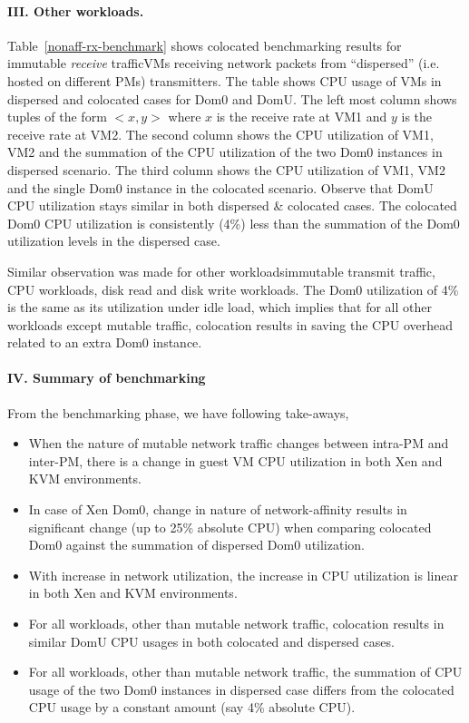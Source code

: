 \paragraph{III. Other workloads.}
Table~\ref{nonaff-rx-benchmark} shows colocated benchmarking
results for immutable \textit{receive} traffic\textemdash{}VMs receiving 
network packets from ``dispersed'' (i.e. hosted on different PMs) transmitters. 
The table shows CPU usage of VMs in
dispersed and colocated cases for Dom0 and DomU.
The left most column shows tuples of the form $<x,y>$ where
$x$ is the receive rate at VM1 and $y$ is the receive
rate at VM2. The second column shows the CPU utilization of 
VM1, VM2 and the summation of the CPU utilization of the two 
Dom0 instances in dispersed scenario. The third column shows
the CPU utilization of VM1, VM2 and the single Dom0 instance
in the colocated scenario.
Observe that
DomU CPU utilization stays similar in both dispersed \& colocated
cases.
The colocated Dom0
CPU utilization is consistently (4\%) less than 
the summation of the Dom0 utilization
levels in the dispersed case.

Similar observation was made for other workloads\textemdash{}immutable
transmit traffic, CPU workloads, disk read and disk write workloads. 
The Dom0 utilization of 4\% is the same as its utilization
under idle load, which implies that for all
other workloads except mutable traffic, colocation results in saving
the CPU overhead related to an extra Dom0 instance.

\paragraph{IV. Summary of benchmarking}
From the benchmarking phase, we have following take-aways,
\begin{itemize}
  \item When the nature of mutable network traffic changes between intra-PM
				  and inter-PM, there
				  is a change in guest VM CPU utilization in both Xen
				  and KVM environments. 
  \item In case of Xen Dom0, change in nature of network-affinity results
				  in significant change (up to 25\% absolute CPU) when comparing
				  colocated Dom0 against the summation of dispersed Dom0 utilization.
  \item With increase in network utilization, 
	  the increase in CPU utilization is linear
			 in both Xen and KVM environments.
	\item For all workloads, other than mutable network traffic, colocation results
		in similar DomU CPU usages in both colocated and dispersed cases.
	\item For all workloads, other than mutable network traffic, the summation of CPU 
		usage of the two Dom0 instances in dispersed case differs from the 
		colocated CPU usage by a constant amount (say 4\% absolute CPU). 
\end{itemize}
		  
